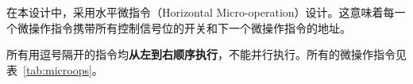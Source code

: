 \documentclass[lang=cn,a4paper,newtx]{elegantpaper}
\begin{document}
在本设计中，采用水平微指令（Horizontal Micro-operation）设计。这意味着每一个微操作指令携带所有控制信号位的开关和下一个微操作指令的地址。

所有用逗号隔开的指令均\textbf{从左到右顺序执行}，不能并行执行。所有的微操作指令见表~\ref{tab:microops}。








\end{document}
